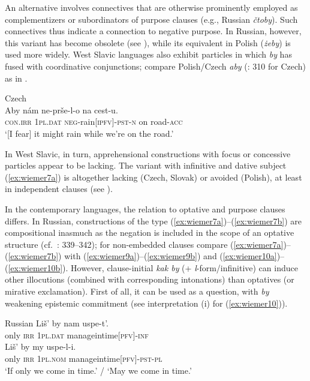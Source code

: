 \documentclass[output=paper,colorlinks,citecolor=brown]{langscibook}
\begin{document}
An alternative involves connectives that are otherwise prominently employed as complementizers or subordinators of purpose clauses (e.g., Russian \textit{čtoby}). Such connectives thus indicate a connection to negative purpose. In Russian, however, this variant has become obsolete (see ), while its equivalent in Polish (\textit{żeby}) is used more widely. West Slavic languages also exhibit particles in which \textit{by} has fused with coordinative conjunctions; compare Polish/Czech \textit{aby} (\citealt{lichtenberk1995}: 310 for Czech) as in .


\ea \textnormal{Czech} \\
\label{ex:wiemer8} 
\gll Aby nám ne-prše-l-o na cest-u. \\
\textsc{con.irr} \textsc{1pl.dat} \textsc{neg}-rain\textsc{[ipfv]-pst-n} on road-\textsc{acc} \\
\glt `[I fear] it might rain while we're on the road.'
\z


In West Slavic, in turn, apprehensional constructions with focus or concessive particles appear to be lacking. The variant with infinitive and dative subject (\ref{ex:wiemer7a}) is altogether lacking (Czech, Slovak) or avoided (Polish), at least in independent clauses (see ). 

In the contemporary languages, the relation to optative and purpose clauses differs. In Russian, constructions of the type (\ref{ex:wiemer7a})--(\ref{ex:wiemer7b}) are compositional \mbox{inasmuch} as the negation is included in the scope of an optative structure (cf.\ \citealt{Dobrushina2016}: 339--342); for non-embedded clauses compare (\ref{ex:wiemer7a})--(\ref{ex:wiemer7b}) with (\ref{ex:wiemer9a})--(\ref{ex:wiemer9b}) and (\ref{ex:wiemer10a})--(\ref{ex:wiemer10b}). However, clause-initial \textit{kak by} (+ \textit{l}-form/infinitive) can induce other illocutions (combined with corresponding intonations) than optatives (or mirative exclamation). First of all, it can be used as a question, with \textit{by} weakening epistemic commitment (see interpretation (i) for (\ref{ex:wiemer10})).

\newpage
\ea \textnormal{Russian}
\label{ex:wiemer9} 
\ea \label{ex:wiemer9a}
\gll Liš' by {\op}nam{\cp} uspe-t'. \\
only \textsc{irr} \textsc{1pl.dat} manage\textunderscore in\textunderscore time\textsc{[pfv]-inf} \\
\ex \label{ex:wiemer9b}
\gll Liš' by my uspe-l-i. \\
only \textsc{irr} \textsc{1pl.nom} manage\textunderscore in\textunderscore time\textsc{[pfv]-pst-pl}\\
\glt `If only we come in time.' / `May we come in time.'
\z
\z
\end{document}
